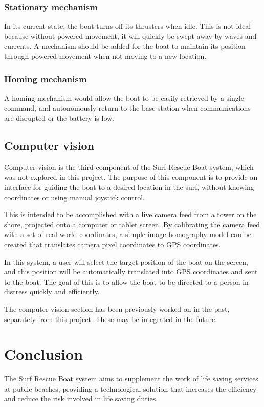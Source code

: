 \documentclass[a4paper]{IEEEtran}
\begin{document}
\subsubsection{Stationary mechanism}
In its current state, the boat turns off its thrusters when idle. This is not ideal because without powered movement, it will quickly be swept away by waves and currents. A mechanism should be added for the boat to maintain its position through powered movement when not moving to a new location.

\subsubsection{Homing mechanism}
A homing mechanism would allow the boat to be easily retrieved by a single command, and autonomously return to the base station when communications are disrupted or the battery is low. 

\subsection{Computer vision}
Computer vision is the third component of the Surf Rescue Boat system, which was not explored in this project. The purpose of this component is to provide an interface for guiding the boat to a desired location in the surf, without knowing coordinates or using manual joystick control.

This is intended to be accomplished with a live camera feed from a tower on the shore, projected onto a computer or tablet screen. By calibrating the camera feed with a set of real-world coordinates, a simple image homography model can be created that translates camera pixel coordinates to GPS coordinates. 

In this system, a user will select the target position of the boat on the screen, and this position will be automatically translated into GPS coordinates and sent to the boat. The goal of this is to allow the boat to be directed to a person in distress quickly and efficiently.

The computer vision section has been previously worked on in the past, separately from this project. These may be integrated in the future.

\section{Conclusion}
The Surf Rescue Boat system aims to supplement the work of life saving services at public beaches, providing a technological solution that increases the efficiency and reduce the risk involved in life saving duties.
\end{document}
